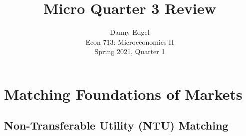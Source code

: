 \documentclass{article}
\begin{document}
\title{	Micro Quarter 3 Review }
\author{ 	Danny Edgel 					\\ 
		Econ 713: Microeconomics II		\\
		Spring 2021, Quarter 1			\\
		}
\maketitle\thispagestyle{empty}




\section{Matching Foundations of Markets}



\subsection{Non-Transferable Utility (NTU) Matching}
\end{document}
